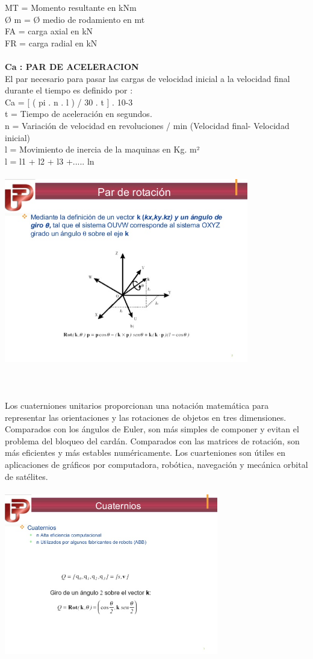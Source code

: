 \documentclass[10pt,a4paper]{article}
\begin{document}
MT = Momento resultante en kNm\\
Ø m = Ø medio de rodamiento en mt\\
FA = carga axial en  kN\\
FR = carga radial en kN\\ \\
\textbf{Ca : PAR DE ACELERACION}\\
 El par necesario para pasar las cargas de velocidad inicial a la velocidad final durante el tiempo es definido por : \\
 Ca = [ ( pi . n . l ) / 30 . t ] . 10-3 \\
 t = Tiempo de aceleración en segundos.\\
n = Variación de velocidad en revoluciones / min
(Velocidad final- Velocidad inicial)\\
l = Movimiento de inercia de la maquinas en Kg. m²\\
l = l1 + l2 + l3 +..... ln\\ \\
\includegraphics[width=0.8\textwidth]{robotica-cinematica2-2-638.jpg}\\ \\ \\ \\
Los cuaterniones unitarios proporcionan una notación matemática para representar las orientaciones y las rotaciones de objetos en tres dimensiones. Comparados con los ángulos de Euler, son más simples de componer y evitan el problema del bloqueo del cardán. Comparados con las matrices de rotación, son más eficientes y más estables numéricamente. Los cuarteniones son útiles en aplicaciones de gráficos por computadora, robótica, navegación y mecánica orbital de satélites.\\ \\
\includegraphics[width=0.7\textwidth]{cuaternio.jpg}
\vspace{5.5cm}



\end{document}
